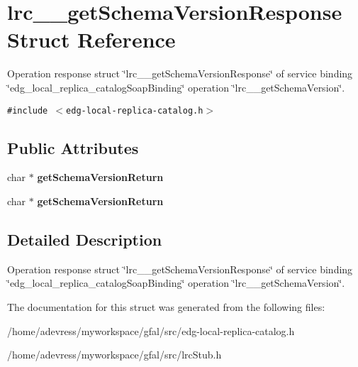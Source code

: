 \section{lrc\_\-\_\-get\-Schema\-Version\-Response Struct Reference}
\label{structlrc____getSchemaVersionResponse}
Operation response struct \char`\"{}lrc\_\-\_\-get\-Schema\-Version\-Response\char`\"{} of service binding \char`\"{}edg\_\-local\_\-replica\_\-catalog\-Soap\-Binding\char`\"{} operation \char`\"{}lrc\_\-\_\-get\-Schema\-Version\char`\"{}.  


{\tt \#include $<$edg-local-replica-catalog.h$>$}

\subsection*{Public Attributes}
\begin{CompactItemize}
\item 
char $\ast$ \textbf{get\-Schema\-Version\-Return}\label{structlrc____getSchemaVersionResponse_f1f1b30e593176a1d6cc45a918060782}

\item 
char $\ast$ \textbf{get\-Schema\-Version\-Return}\label{structlrc____getSchemaVersionResponse_f1f1b30e593176a1d6cc45a918060782}

\end{CompactItemize}


\subsection{Detailed Description}
Operation response struct \char`\"{}lrc\_\-\_\-get\-Schema\-Version\-Response\char`\"{} of service binding \char`\"{}edg\_\-local\_\-replica\_\-catalog\-Soap\-Binding\char`\"{} operation \char`\"{}lrc\_\-\_\-get\-Schema\-Version\char`\"{}. 



The documentation for this struct was generated from the following files:\begin{CompactItemize}
\item 
/home/adevress/myworkspace/gfal/src/edg-local-replica-catalog.h\item 
/home/adevress/myworkspace/gfal/src/lrc\-Stub.h\end{CompactItemize}
